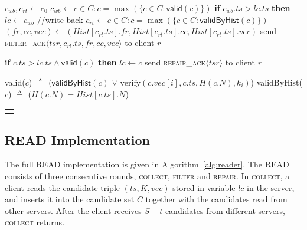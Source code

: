 \documentclass[10pt,conference,compsocconf]{IEEEtran}
\newcommand{\mprotocol}{M-PoWerStore}
\newcommand{\nonce}{N}
\newcommand{\hash}{\overline{N}}
\begin{document}
\begin{algo*}[t]
\begin{minipage}[t]{0.44\textwidth}
\begin{distribalgo}[1]
\setcounter{alg:client1:lines}{\value{ALC@line}}
\end{distribalgo}
\end{minipage}\hfill
\begin{minipage}[t]{0.56\textwidth}
\begin{distribalgo}[1]   \setcounter{ALC@line}{\value{alg:client1:lines}}
\vspace{-1 em}
\STATE $c_{wb}, c_{rt} \leftarrow c_0$
\STATE $c_{wb} \leftarrow c \in C: c$$=$$\max(\{c \in C: \textsf{valid}(c)\})$ \label{alg2:server:valid-filter}
\STATE \textbf{if} $c_{wb}.ts > lc.ts$ \textbf{then} $lc \leftarrow c_{wb} $\label{alg2:server:update-filter} \hfill //write-back
\smallskip
\STATE $c_{rt} \leftarrow c \in C: c$$=$$\max(\{c \in C: \textsf{validByHist}(c)\})$ \label{alg2:server:valid-nonce}
\STATE $(fr, cc, vec) \leftarrow (Hist[c_{rt}.ts].fr, Hist[c_{rt}.ts].cc, Hist[c_{rt}.ts].vec)$
\STATE send \textsc{filter\_ack}$\langle tsr, c_{rt}.ts, fr, cc, vec \rangle$ to client $r$ \label{alg2:server:ret}
\ENDINDENT

\medskip
{}
\STATE \textbf{if} $c.ts > lc.ts \wedge \textsf{valid}(c)$ \textbf{then} $lc \leftarrow c$ \label{alg2:server:update-repair}\label{alg2:server:valid-repair}
\STATE send \textsc{repair\_ack}$\langle tsr\rangle$ to client $r$
\ENDINDENT

\medskip
{}
\STATE \textsf{valid}($c$) $\triangleq$ ($\textsf{validByHist}(c)$ $\vee$ $\mathrm{verify}(c.vec[i], c.ts, H(c.\nonce), k_i)$) \label{alg2:server:valid-pred}
\STATE \textsf{validByHist}($c$) $\triangleq$ ($H(c.\nonce) = Hist[c.ts].\hash$)
\ENDINDENT

\setcounter{alg:client1:lines}{\value{ALC@line}}
\end{distribalgo}

\end{minipage}

\begin{tabular}{c}\hline\mbox{}\hspace{0.97\textwidth}\mbox{}\end{tabular}
\vspace{-1 em}
\caption{{Algorithm of server $s_i$ in \mprotocol.}}\label{alg2:server}
\end{algo*}


\subsection{\textsc{READ} Implementation}
The full \textsc{READ} implementation is given in Algorithm~\ref{alg:reader}.
The \textsc{READ} consists of three consecutive rounds, \textsc{collect}, \textsc{filter} and \textsc{repair}. In \textsc{collect}, a client reads the candidate triple $(ts, K, vec)$ stored in variable $lc$ in the server, and inserts it into the candidate set $C$ together with the candidates read from other servers. After the client receives $S-t$ candidates from different servers, \textsc{collect} returns.
\end{document}
